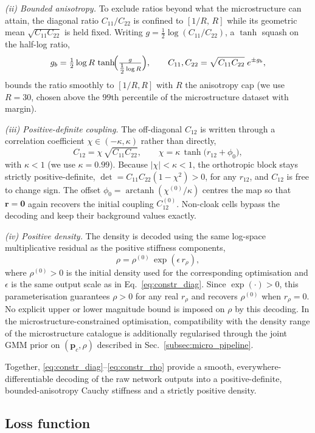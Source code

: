 \documentclass[preprint,12pt]{elsarticle}
\newcommand{\mbf}[1]{\mathbf{#1}}
\newcommand{\be}{\begin{equation}}
\newcommand{\ee}{\end{equation}}
\begin{document}
\emph{(ii) Bounded anisotropy.} To exclude ratios beyond what the
microstructure can attain, the diagonal ratio $C_{11}/C_{22}$ is confined
to $[1/R,\,R]$ while its geometric mean $\sqrt{C_{11}C_{22}}$ is held
fixed. Writing $g=\tfrac12\log(C_{11}/C_{22})$, a $\tanh$ squash on the
half-log ratio,
\be\label{eq:constr_aniso}
  g_b = \tfrac12\log R\,\tanh\!\Bigl(\tfrac{g}{\tfrac12\log R}\Bigr),
  \qquad
  C_{11},C_{22}=\sqrt{C_{11}C_{22}}\;e^{\pm g_b},
\ee
bounds the ratio smoothly to $[1/R,R]$ with $R$ the anisotropy cap (we
use $R=30$, chosen above the $99$th percentile of the microstructure
dataset with margin).

\emph{(iii) Positive-definite coupling.} The off-diagonal $C_{12}$ is
written through a correlation coefficient $\chi\in(-\kappa,\kappa)$
rather than directly,
\be\label{eq:constr_c12}
  C_{12}=\chi\,\sqrt{C_{11}C_{22}},
\qquad
\chi=\kappa\,\tanh\!\bigl(r_{12}+\phi_0\bigr),
\ee
with $\kappa<1$ (we use $\kappa=0.99$). Because $|\chi|<\kappa<1$, the
orthotropic block stays strictly positive-definite,
$\det=C_{11}C_{22}(1-\chi^2)>0$, for any $r_{12}$, and $C_{12}$ is free
to change sign. The offset $\phi_0=\operatorname{arctanh}(\chi^{(0)}/\kappa)$
centres the map so that $\mbf{r}=\mbf 0$ again recovers the initial
coupling $C_{12}^{(0)}$. Non-cloak cells bypass the decoding and keep
their background values exactly.

\emph{(iv) Positive density.} The density is decoded using the same
log-space multiplicative residual as the positive stiffness components,
\be\label{eq:constr_rho}
  \rho = \rho^{(0)}\,\exp(\epsilon\,r_{\rho}),
\ee
where $\rho^{(0)}>0$ is the initial density used for the corresponding
optimisation and $\epsilon$ is the same output scale as in
Eq.~\eqref{eq:constr_diag}. Since $\exp(\cdot)>0$, this parameterisation
guarantees $\rho>0$ for any real $r_{\rho}$ and recovers
$\rho^{(0)}$ when $r_{\rho}=0$. No explicit upper or lower magnitude
bound is imposed on $\rho$ by this decoding. In the
microstructure-constrained optimisation, compatibility with the
density range of the microstructure catalogue is additionally
regularised through the joint GMM prior on $(\mbf{p}_c,\rho)$ described
in Sec.~\ref{subsec:micro_pipeline}.

Together, \eqref{eq:constr_diag}--\eqref{eq:constr_rho} provide a smooth,
everywhere-differentiable decoding of the raw network outputs into a
positive-definite, bounded-anisotropy Cauchy stiffness and a strictly
positive density.

\subsection{Loss function}
\end{document}

